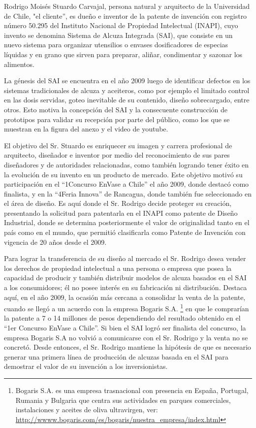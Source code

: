 Rodrigo Moisés Stuardo Carvajal, persona natural y arquitecto de la Universidad de Chile, "el cliente'', es dueño e inventor de la patente de invención con registro número 50.295 del Instituto Nacional de Propiedad Intelectual (INAPI), cuyo invento se denomina Sistema de Alcuza Integrada (SAI), que consiste en un nuevo sistema para organizar utensilios o envases dosificadores de especias líquidas y en grano que sirven para preparar, aliñar, condimentar y sazonar los alimentos.

La génesis del SAI se encuentra en el año 2009 luego de identificar defectos en los sistemas tradicionales de alcuza y aceiteros, como por ejemplo el limitado control en las dosis servidas, goteo inevitable de su contenido, diseño sobrecargado, entre otros. Esto motiva la concepción del SAI y la consecuente construcción de prototipos para validar su recepción por parte del público, como los que se muestran en la figura del anexo y el video de youtube.

El objetivo del Sr. Stuardo es enriquecer su imagen y carrera profesional de arquitecto, diseñador e inventor por medio del reconocimiento de sus pares diseñadores y de autoridades relacionadas, como también logrando tener éxito en la evolución de su invento en un producto de mercado. Este objetivo motivó su participación en el  “1\textordmasculine Concurso EnVase a Chile” el año 2009, donde destacó como finalista, y en la “4\textordmasculine Feria Innova” de Rancagua, donde también fue seleccionado en el área de diseño. Es aquí donde el Sr. Rodrigo decide proteger su creación, presentando la solicitud para patentarla en el INAPI como patente de Diseño Industrial, donde se determina posteriormente el valor de originalidad tanto en el país como en el mundo, que permitió clasificarla como Patente de Invención con vigencia de 20 años desde el 2009.

Para lograr la transferencia de su diseño al mercado el Sr. Rodrigo desea vender los derechos de propiedad intelectual a una persona o empresa que posea la capacidad de producir y también distribuir modelos de alcuza basados en el SAI a los consumidores; él no posee interés en su fabricación ni distribución. Destaca aquí, en el año 2009, la ocasión más cercana a consolidar la venta de la patente, cuando se llegó a un acuerdo con la empresa Bogaris S.A.
\footnote{
Bogaris S.A. es una empresa trasnacional con presencia en España, Portugal, Rumania y Bulgaria que centra sus actividades en parques comerciales, instalaciones y aceites de oliva ultravirgen, ver:
 \url{http://wwww.bogaris.com/es/bogaris/nuestra_empresa/index.html}

 }
 en que le comprarían la patente a 7 o 14 millones de pesos dependiendo del resultado obtenido en el “1er Concurso EnVase a Chile”. Si bien el SAI logró ser finalista del concurso, la empresa Bogaris S.A no volvió a comunicarse con el Sr. Rodrigo y la venta no se concretó. Desde entonces, el Sr. Rodrigo mantiene la hipótesis de que es necesario generar una primera línea de producción de alcuzas basada en el SAI para demostrar el valor de su invención a los inversionistas.

